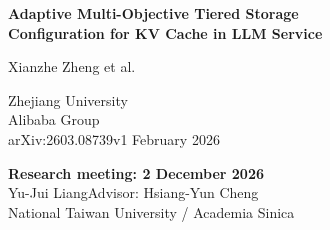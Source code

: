 \documentclass[aspectratio=169,10pt]{beamer}
\newcommand{\slidesource}{}
\newcommand{\src}[1]{\gdef\slidesource{#1}}
\begin{document}
\begin{frame}[t]
\vspace*{\fill}
{\LARGE\bfseries Adaptive Multi-Objective Tiered Storage\\Configuration for KV Cache in LLM Service\par}
\vspace{.55cm}
{\large Xianzhe Zheng et al.\par}
\vspace{.12cm}
{\color{Muted}Zhejiang University\\Alibaba Group\\arXiv:2603.08739v1  February 2026}\par
\vspace{.75cm}
\textbf{Research meeting: 2 December 2026}\\[.12cm]
Yu-Jui Liang\quad Advisor: Hsiang-Yun Cheng\\
National Taiwan University / Academia Sinica
\par\vfill
\src{Source: Kareto v1, Abstract and §§1–2, pp. 1–2. Preprint; no venue claim.}
\end{frame}
\end{document}
